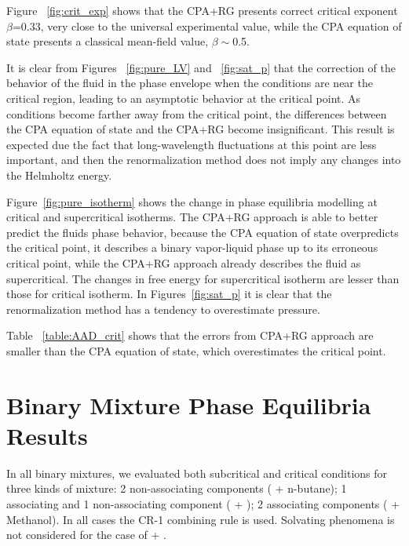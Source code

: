 \documentclass[preprint,12pt,3p]{elsarticle}
\providecommand{\DIFadd}[1]{{\protect\color{blue}\uwave{#1}}} %
\providecommand{\DIFdel}[1]{{\protect\color{red}\sout{#1}}}                      %
\providecommand{\DIFaddbegin}{} %
\providecommand{\DIFaddend}{} %
\providecommand{\DIFdelbegin}{} %
\providecommand{\DIFdelend}{} %
\begin{document}
    Figure ~\ref{fig:crit_exp} shows that the CPA+RG presents correct critical exponent $\beta$=0.33, very close to the universal experimental value, while the CPA equation of state presents a classical mean-field value, $\beta \sim$0.5.

    It is clear from Figures ~\ref{fig:pure_LV} and ~\ref{fig:sat_p} that the correction of the behavior of the fluid in the phase envelope when the conditions are near the critical region, leading to an asymptotic behavior at the critical point. As conditions become farther away from the critical point, the differences between the CPA equation of state and the CPA+RG become insignificant. This result is expected due the fact that long-wavelength fluctuations at this point are less important, and then the renormalization method does not imply any changes into the Helmholtz energy. 

    Figure~\ref{fig:pure_isotherm} shows the change in phase equilibria modelling at critical and supercritical isotherms. The CPA+RG approach is able to better predict the fluids phase behavior, because the CPA equation of state overpredicts the critical point, it describes a binary vapor-liquid phase up to its erroneous critical point, while the CPA+RG approach already describes the fluid as supercritical. The changes in free energy for supercritical isotherm are lesser than those for critical isotherm. In Figures~\ref{fig:sat_p} it is clear that the renormalization method has a tendency to overestimate pressure.

    Table ~\ref{table:AAD_crit} shows that the errors from CPA+RG approach are smaller than the CPA equation of state, which overestimates the critical point.

\section{Binary Mixture Phase Equilibria Results}

    In all binary mixtures, we evaluated both subcritical and critical conditions for three kinds of mixture: 2 non-associating components ( + n-butane); 1 associating and 1 non-associating component (\DIFdelbegin \DIFdel{ }\DIFdelend \DIFaddbegin \DIFadd{\ce{H_2S} }\DIFaddend + ); 2 associating components (\DIFdelbegin \DIFdel{ }\DIFdelend \DIFaddbegin \DIFadd{\ce{H_2S} }\DIFaddend + Methanol). In all cases the CR-1 combining rule is used. Solvating phenomena is not considered for the case of \DIFdelbegin \DIFdel{ }\DIFdelend \DIFaddbegin \DIFadd{\ce{H_2S} }\DIFaddend + .
\end{document}
